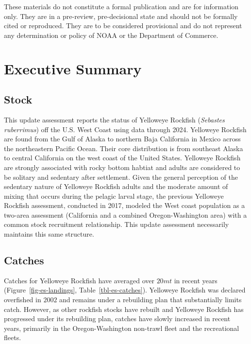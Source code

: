 \documentclass[
]{scrartcl}
\begin{document}
These materials do not constitute a formal publication and are for
information only. They are in a pre-review, pre-decisional state and
should not be formally cited or reproduced. They are to be considered
provisional and do not represent any determination or policy of NOAA or
the Department of Commerce.

\newpage{}

\newpage{}


\section*{Executive Summary}\label{executive-summary}

\subsection*{Stock}\label{stock}

This update assessment reports the status of Yelloweye Rockfish
(\emph{Sebastes ruberrimus}) off the U.S. West Coast using data through
2024. Yelloweye Rockfish are found from the Gulf of Alaska to northern
Baja California in Mexico across the northeastern Pacific Ocean. Their
core distribution is from southeast Alaska to central California on the
west coast of the United States. Yelloweye Rockfish are strongly
associated with rocky bottom habtiat and adults are considered to be
solitary and sedentary after settlement. Given the general perception of
the sedentary nature of Yelloweye Rockfish adults and the moderate
amount of mixing that occurs during the pelagic larval stage, the
previous Yelloweye Rockfish assessment, conducted in 2017, modeled the
West coast population as a two-area assessment (California and a
combined Oregon-Washington area) with a common stock recruitment
relationship. This update assessment necessarily maintains this same
structure.

\subsection*{Catches}\label{catches}

Catches for Yelloweye Rockfish have averaged over \(20 mt\) in recent
years (Figure~\ref{fig-es-landings}, Table~\ref{tbl-es-catches}).
Yelloweye Rockfish was declared overfished in \(2002\) and remains under
a rebuilding plan that substantially limits catch. However, as other
rockfish stocks have rebuilt and Yelloweye Rockfish has progressed under
its rebuilding plan, catches have slowly increased in recent years,
primarily in the Oregon-Washington non-trawl fleet and the recreational
fleets.
\end{document}
